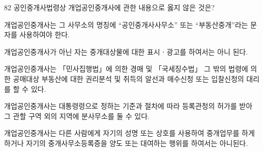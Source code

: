 \begin{question}{82}
공인중개사법령상 개업공인중개사에 관한 내용으로 옳지 않은 것은?
\begin{choices}
  \item 개업공인중개사는 그 사무소의 명칭에 “공인중개사사무소” 또는 “부동산중개”라는 문자를 사용하여야 한다.
  \item 개업공인중개사가 아닌 자는 중개대상물에 대한 표시ㆍ광고를 하여서는 아니 된다.
  \item 개업공인중개사는 「민사집행법」에 의한 경매 및 「국세징수법」 그 밖의 법령에 의한 공매대상 부동산에 대한 권리분석 및 취득의 알선과 매수신청 또는 입찰신청의 대리를 할 수 있다.
  \item 개업공인중개사는 대통령령으로 정하는 기준과 절차에 따라 등록관청의 허가를 받아 그 관할 구역 외의 지역에 분사무소를 둘 수 있다.
  \item 개업공인중개사는 다른 사람에게 자기의 성명 또는 상호를 사용하여 중개업무를 하게 하거나 자기의 중개사무소등록증을 양도 또는 대여하는 행위를 하여서는 아니된다.
\end{choices}
\end{question}
